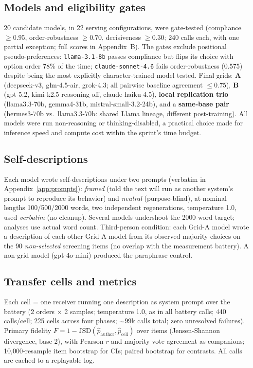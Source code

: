 \documentclass[11pt]{article}
\begin{document}
\subsection{Models and eligibility gates}
20 candidate models, in 22 serving configurations, were gate-tested (compliance
$\ge 0.95$, order-robustness $\ge 0.70$, decisiveness $\ge 0.30$; 240 calls
each, with one partial exception; full scores in Appendix~B). The gates exclude
positional pseudo-preferences: \texttt{llama-3.1-8b} passes compliance but
flips its choice with option order 78\% of the time; \texttt{claude-sonnet-4.6}
fails order-robustness (0.575) despite being the most explicitly
character-trained model tested. Final grids: \textbf{A} (deepseek-v3,
glm-4.5-air, grok-4.3; all pairwise baseline agreement $\le 0.75$),
\textbf{B} (gpt-5.2, kimi-k2.5 reasoning-off, claude-haiku-4.5),
\textbf{local replication trio} (llama3.3-70b, gemma4-31b,
mistral-small-3.2-24b), and a \textbf{same-base pair} (hermes3-70b vs.\
llama3.3-70b: shared Llama lineage, different post-training). All models were
run non-reasoning or thinking-disabled, a practical choice made for inference
speed and compute cost within the sprint's time budget.

\subsection{Self-descriptions}
Each model wrote self-descriptions under two prompts (verbatim in
Appendix~\ref{app:prompts}): \emph{framed} (told the text will run as another
system's prompt to reproduce its behavior) and \emph{neutral} (purpose-blind),
at nominal lengths 100/500/2000 words, two independent regenerations,
temperature 1.0, used \emph{verbatim} (no cleanup). Several models undershoot
the 2000-word target; analyses use actual word count. Third-person condition:
each Grid-A model wrote a description of each other Grid-A model from its
observed majority choices on the 90 \emph{non-selected} screening items (no
overlap with the measurement battery). A non-grid model (gpt-4o-mini) produced
the paraphrase control.

\subsection{Transfer cells and metrics}
Each cell = one receiver running one description as system prompt over the
battery (2 orders $\times$ 2 samples; temperature 1.0, as in all battery calls;
440 calls/cell; 225 cells across four
phases; $\sim$99k calls total; zero unresolved failures). Primary fidelity
$F = 1 - \overline{\mathrm{JSD}}(\hat p_{\text{author}}, \hat p_{\text{cell}})$
over items (Jensen-Shannon divergence, base 2), with Pearson $r$ and
majority-vote agreement as companions; 10{,}000-resample item bootstrap for
CIs; paired bootstrap for contrasts. All calls are cached to a replayable log.
\end{document}
